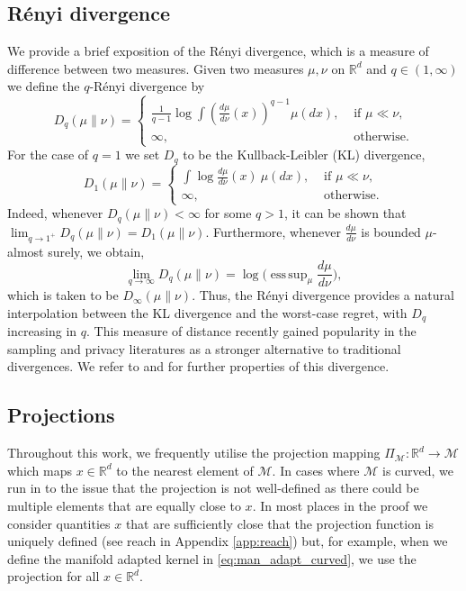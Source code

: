 \documentclass[10pt]{article}
\theoremstyle{plain}
\theoremstyle{definition}
\theoremstyle{remark}
\newcommand{\M}{{\mathcal{M}}}
\newcommand{\R}{\mathbb{R}}
\begin{document}
\subsection{R\'enyi divergence}\label{app:renyi}
We provide a brief exposition of the R\'enyi divergence, which is a measure of difference between two measures. Given two measures \(\mu, \nu\) on \(\R^d\) and \(q \in (1, \infty)\) we define the \(q\)-R\'enyi divergence by
\begin{equation*}
    D_q(\mu \| \nu) = \begin{cases}
        \frac{1}{q-1} \log \int (\frac{d\mu}{d\nu}(x))^{q-1} \mu(dx), &\text{ if } \mu \ll \nu,\\
        \infty, &\text{ otherwise.}
    \end{cases}
\end{equation*}
For the case of \(q = 1\) we set \(D_q\) to be the Kullback-Leibler (KL) divergence,
\begin{equation*}
    D_1(\mu \| \nu) = \begin{cases}
        \int \log \frac{d\mu}{d\nu}(x) \ \mu(dx), &\text{ if } \mu \ll \nu,\\
        \infty, &\text{ otherwise.}
    \end{cases}
\end{equation*}
Indeed, whenever \(D_q(\mu \| \nu) < \infty\) for some \(q > 1\), it can be shown that \(\lim_{q \to 1^+} D_q(\mu \| \nu) = D_1(\mu \| \nu)\). Furthermore, whenever \(\frac{d\mu}{d\nu}\) is bounded \(\mu\)-almost surely, we obtain,
\begin{equation*}
    \lim_{q \to \infty} D_q(\mu\|\nu) = \log \bigg ( \operatorname{ess \, sup}_{\mu} \frac{d\mu}{d\nu} \bigg ),
\end{equation*}
which is taken to be \(D_\infty(\mu\|\nu)\). Thus, the R\'{e}nyi divergence provides a natural interpolation between the KL divergence and the worst-case regret, with \(D_q\) increasing in \(q\). This measure of distance recently gained popularity in the sampling \citep{Vempala2019-xd, Chewi2022-of, Erdogdu2022-sp, Mousavi-Hosseini2023-xs} and privacy \citep{Mironov2017-vf} literatures as a stronger alternative to traditional divergences. We refer to \citep{Van_Erven2014-ry} and \citep{Chewi2022-of} for further properties of this divergence.

\subsection{Projections}\label{app:projection_details}
Throughout this work, we frequently utilise the projection mapping \(\Pi_\M: \R^d \to \M\) which maps \(x \in \R^d\) to the nearest element of \(\M\). In cases where \(\M\) is curved, we run in to the issue that the projection is not well-defined as there could be multiple elements that are equally close to \(x\). In most places in the proof we consider quantities \(x\) that are sufficiently close that the projection function is uniquely defined (see reach in Appendix \ref{app:reach}) but, for example, when we define the manifold adapted kernel in \eqref{eq:man_adapt_curved}, we use the projection for all \(x \in \R^d\).
\end{document}
